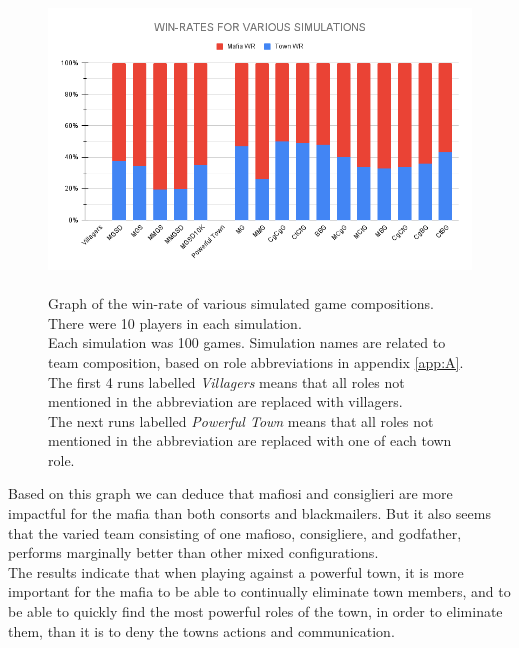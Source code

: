 \begin{figure}[H] \label{fig:kill}
    \includegraphics[width=1\linewidth]{figures/Winrates}
    \caption{\\Graph of the win-rate of various simulated game compositions.\\
        There were 10 players in each simulation.\\
        Each simulation was 100 games.
        Simulation names are related to team composition, based on role
        abbreviations in appendix \ref{app:A}.\\
        The first 4 runs labelled \textit{Villagers} means that all roles not
        mentioned in the abbreviation are replaced with villagers.\\
        The next runs labelled \textit{Powerful Town} means that all roles not
        mentioned in the abbreviation are replaced with	one of each town role.}
    \label{fig:VariousSimulations}
\end{figure}
\vspace{-5px}Based on this graph we can deduce that mafiosi and
consiglieri are more
impactful for the mafia than both consorts and blackmailers. But it also seems
that the varied team consisting of one mafioso, consigliere, and godfather,
performs marginally better than other mixed configurations. \\
The results indicate  that when playing against a powerful town, it is more
important for the mafia to be able to continually eliminate town members, and to be
able to quickly find the most powerful roles of the town, in order to eliminate
them, than it is to deny the towns actions and communication. \\
